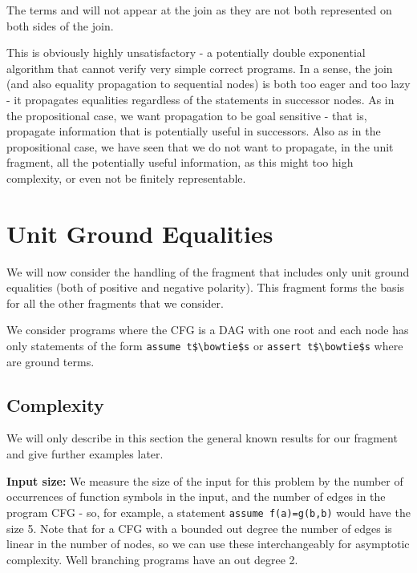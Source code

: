 The terms  and  will not appear at the join as they are not both represented on both sides of the join.

This is obviously highly unsatisfactory - a potentially double exponential algorithm that cannot verify very simple correct programs.
In a sense, the join (and also equality propagation to sequential nodes) is both too eager and too lazy - it propagates equalities regardless of the statements in successor nodes.
As in the propositional case, we want propagation to be goal sensitive - that is, propagate information that is potentially useful in successors. Also as in the propositional case, we have seen that we do not want to propagate, in the unit fragment, all the potentially useful information, as this might too high complexity, or even not be finitely representable.

\newpage
\section{Unit Ground Equalities}
We will now consider the handling of the fragment that includes only unit ground equalities (both of positive and negative polarity).
This fragment forms the basis for all the other fragments that we consider.

We consider programs where the CFG is a DAG with one root and each node has only statements of the form \lstinline{assume t$\bowtie$s} or \lstinline[mathescape]{assert t$\bowtie$s} where  are ground terms.

\subsection{Complexity}
We will only describe in this section the general known results for our fragment and give further examples later.

\textbf{Input size:} We measure the size of the input for this problem by the number  of occurrences of function symbols in the input, and the number  of edges in the program CFG - so, for example, a statement \lstinline[mathescape]{assume f(a)=g(b,b)} would have the size 5. 
Note that for a CFG with a bounded out degree the number of edges is linear in the number of nodes, so we can use these interchangeably for asymptotic complexity. Well branching programs have an out degree 2.


